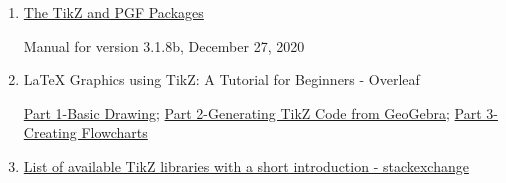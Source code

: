 \begin{enumerate}

    \item \href{https://mirror.foobar.to/CTAN/graphics/pgf/base/doc/pgfmanual.pdf}{The TikZ and PGF Packages}
    
        Manual for version 3.1.8b, December 27, 2020
    \item LaTeX Graphics using TikZ: A Tutorial for Beginners - Overleaf
    
    \href{https://www.overleaf.com/learn/latex/LaTeX_Graphics_using_TikZ:_A_Tutorial_for_Beginners_(Part_1)%E2%80%94Basic_Drawing}{Part 1-Basic Drawing}; 
    \href{https://www.overleaf.com/learn/latex/LaTeX_Graphics_using_TikZ:_A_Tutorial_for_Beginners_(Part_2)%E2%80%94Generating_TikZ_Code_from_GeoGebra}{Part 2-Generating TikZ Code from GeoGebra}; 
    \href{https://www.overleaf.com/learn/latex/LaTeX_Graphics_using_TikZ:_A_Tutorial_for_Beginners_(Part_3)%E2%80%94Creating_Flowcharts}{Part 3-Creating Flowcharts}
    
    \item \href{https://tex.stackexchange.com/questions/42611/list-of-available-tikz-libraries-with-a-short-introduction}{List of available TikZ libraries with a short introduction - stackexchange}
    
\end{enumerate}